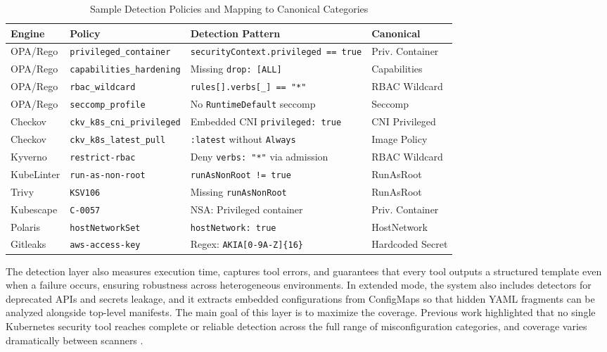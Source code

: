 \documentclass[preprint,12pt]{elsarticle}
\begin{document}
\begin{table}[htbp]
\centering
\caption{Sample Detection Policies and Mapping to Canonical Categories}
\label{tab:detection_policy_samples}
\scriptsize
\begin{tabular}{@{}llp{4.5cm}l@{}}
\toprule
\textbf{Engine} & \textbf{Policy} & \textbf{Detection Pattern} & \textbf{Canonical} \\
\midrule
OPA/Rego & \texttt{privileged\_container} & \texttt{securityContext.privileged == true} & Priv. Container \\
OPA/Rego & \texttt{capabilities\_hardening} & Missing \texttt{drop: [ALL]} & Capabilities \\
OPA/Rego & \texttt{rbac\_wildcard} & \texttt{rules[].verbs[\_] == "*"} & RBAC Wildcard \\
OPA/Rego & \texttt{seccomp\_profile} & No \texttt{RuntimeDefault} seccomp & Seccomp \\
\midrule
Checkov & \texttt{ckv\_k8s\_cni\_privileged} & Embedded CNI \texttt{privileged: true} & CNI Privileged \\
Checkov & \texttt{ckv\_k8s\_latest\_pull} & \texttt{:latest} without \texttt{Always} & Image Policy \\
\midrule
Kyverno & \texttt{restrict-rbac} & Deny \texttt{verbs: "*"} via admission & RBAC Wildcard \\
\midrule
KubeLinter & \texttt{run-as-non-root} & \texttt{runAsNonRoot != true} & RunAsRoot \\
Trivy & \texttt{KSV106} & Missing \texttt{runAsNonRoot} & RunAsRoot \\
Kubescape & \texttt{C-0057} & NSA: Privileged container & Priv. Container \\
Polaris & \texttt{hostNetworkSet} & \texttt{hostNetwork: true} & HostNetwork \\
Gitleaks & \texttt{aws-access-key} & Regex: \texttt{AKIA[0-9A-Z]\{16\}} & Hardcoded Secret \\
\bottomrule
\end{tabular}
\end{table}





The detection layer also measures execution time, captures tool errors, and guarantees that every tool outputs a structured template even when a failure occurs, ensuring robustness across heterogeneous environments. In extended mode, the system also includes detectors for deprecated APIs and secrets leakage, and it extracts embedded configurations from ConfigMaps so that hidden YAML fragments can be analyzed alongside top-level manifests. The main goal of this layer is to maximize the coverage. Previous work highlighted that no single Kubernetes security tool reaches complete or reliable detection across the full range of misconfiguration categories, and coverage varies dramatically between scanners \cite{malul2024genkubesec, dellimmagine2023kubehound, ye2025llmsecconfig}. 
\end{document}
